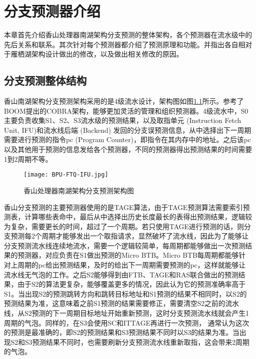 \chapter{分支预测器介绍}


本章首先介绍香山处理器南湖架构分支预测的整体架构，各个预测器在流水级中的先后关系和联系。其次针对每个预测器都介绍了预测原理和功能。并指出各自相对于雁栖湖架构设计做出的修改，以及做出相关修改的原因。

\section{分支预测整体结构}

香山南湖架构分支预测架构采用的是4级流水设计，架构图如图\ref{fig:figure21}所示。参考了BOOM提出的COBRA架构\cite{cobra}，能够更加灵活的管理和组织预测器。4级流水中，S0主要负责收集S1、S2、S3流水级的预测结果，以及取指单元 (Instruction Fetch Unit, IFU)和流水线后端 (Backend) 发回的分支误预测信息，从中选择出下一周期需要进行预测的指令pc (Program Counter)，即指令在其内存中的地址。之后该pc以及其他用于预测的信息发给各个预测器，不同的预测器得出预测结果的时间需要1到2周期不等。

\begin{figure}[htb]
	\centering
	\setlength\tabcolsep{3pt}  %
	\vspace{5pt} %
	\texttt{[image: BPU-FTQ-IFU.jpg]}
	\caption{香山处理器南湖架构分支预测架构图}
	\label{fig:figure21}
\end{figure}

香山分支预测的主要预测器使用的是TAGE算法\cite{tage, tage-sc-l, new-case-tage}，由于TAGE预测算法需要索引预测表，计算哪些表命中，最后从中选择出历史长度最长的表得出预测结果，逻辑较为复杂，需要更长的时间，超过了一个周期。若只使用TAGE进行预测的话，则分支预测每2个周期才能够发出一个取指请求，显然破坏了流水线，因此为了能够让分支预测流水线连续地流水，需要一个逻辑较简单，每周期都能够做出一次预测结果的预测器，对应负责在S1做出预测的Micro BTB。Micro BTB每周期都能够针对上周期的pc给出预测结果，及时的给出下一周期需要预测的pc，这样就能够让流水线无气泡的工作。之后S2能够得到由FTB、TAGE和RAS联合做出的预测结果，由于S2的算法更复杂，能够覆盖更多的情况，因此认为它的预测准确率高于S1。当出现S2的预测跳转方向和跳转目标地址和S1预测的结果不相同时，以S2的预测结果为准，这意味着之前S1预测的结果需要修正，需要清空S2之前的流水线，从S2预测的下一周期目标地址开始重新预测，这时分支预测流水线就会产生1周期的气泡。同样的，在S3会使用SC和ITTAGE再进行一次预测， 通常认为这次的预测是最准确的，即S2的预测结果和S3预测结果不同时以S3的结果为准。当出现S2和S3预测结果不同时，也需要刷新分支预测流水线重新取指，这会带来2周期的气泡。

